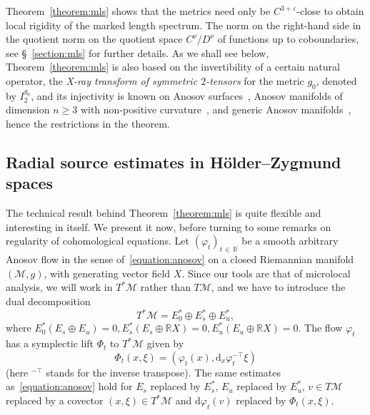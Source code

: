 \documentclass[AHL,Unicode,longabstracts,published]{cedram}
\newcommand{\R}{\mathbb{R}}
\newcommand{\eps}{\varepsilon}
\newcommand{\M}{\mathcal{M}}
\newcommand{\dd}{\mathrm{d}}
\begin{document}
Theorem~\ref{theorem:mls} shows that the metrics need only be $C^{3+\eps}$-close to obtain local rigidity of the marked length spectrum. The norm on the right-hand side in the quotient norm on the quotient space $C^\nu/D^{\nu}$ of functions up to coboundaries, see \S~\ref{section:mls} for further details. As we shall see below, Theorem~\ref{theorem:mls} is also based on the invertibility of a certain natural operator, the \emph{X-ray transform of symmetric $2$-tensors} for the metric $g_0$, denoted by $I_2^{g_0}$, and its injectivity is known on Anosov surfaces~\cite{Paternain-Salo-Uhlmann-14-1, Guillarmou-17-1}, Anosov manifolds of dimension $n \geq 3$ with non-positive curvature~\cite{Croke-Sharafutdinov-98}, and generic Anosov manifolds~\cite{Cekic-Lefeuvre-21}, hence the restrictions in the theorem.



\subsection{Radial source estimates in H\"older--Zygmund spaces}

The technical result behind Theorem~\ref{theorem:mls} is quite flexible and interesting in itself. We present it now, before turning to some remarks on regularity of cohomological equations. Let $(\varphi_t)_{t\,\in\,\R}$ be a smooth arbitrary Anosov flow in the sense of~\eqref{equation:anosov} on a closed Riemannian manifold $(\M,g)$, with generating vector field $X$. Since our tools are that of microlocal analysis, we will work in $T^\ast\M$ rather than $T\M$, and we have to introduce the dual decomposition
\[
T^*\M = E_0^* \oplus E_s^* \oplus E_u^*,
\]
where $E_0^*(E_s\oplus E_u)=0, E_s^*(E_s\oplus \R X) = 0, E_u^*(E_u \oplus \R X)=0$. The flow $\varphi_t$ has a symplectic lift $\Phi_t$ to $T^\ast \M$ given by
\[
\Phi_t(x,\xi) = \left(\varphi_t(x), \dd_x\varphi_t^{-\top} \xi\right)
\]
(here ${}^{-\top}$ stands for the inverse transpose). The same estimates as~\eqref{equation:anosov} hold for $E_s$ replaced by $E_s^*$, $E_u$ replaced by $E_u^*$, $v \in T\M$ replaced by a covector $(x,\xi) \in T^*\M$ and $\dd \varphi_t(v) $ replaced by $\Phi_t(x,\xi)$.
\end{document}
